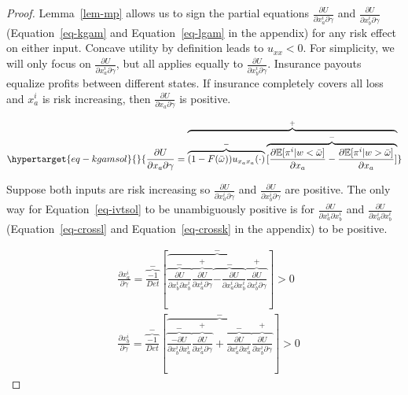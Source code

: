 \documentclass[
  letterpaper,
  DIV=11,
  numbers=noendperiod]{scrartcl}
\theoremstyle{plain}
\theoremstyle{plain}
\theoremstyle{remark}
\begin{document}
\begin{proof}

Lemma~\ref{lem-mp} allows us to sign the partial equations
\(\frac{\partial U}{\partial x^i_a\partial \gamma}\) and
\(\frac{\partial U}{\partial x^i_b\partial \gamma}\)
(Equation~\ref{eq-kgam} and Equation~\ref{eq-lgam} in the appendix) for
any risk effect on either input. Concave utility by definition leads to
\(u_{xx}<0\). For simplicity, we will only focus on
\(\frac{\partial U}{\partial x^i_a\partial \gamma}\), but all applies
equally to \(\frac{\partial U}{\partial x^i_b\partial \gamma}\).
Insurance payouts equalize profits between different states. If
insurance completely covers all loss and \(x^i_a\) is risk increasing,
then \(\frac{\partial U}{\partial x_a\partial \gamma}\) is positive.

\begin{equation}\protect\hypertarget{eq-kgamsol}{}{
\frac{\partial U}{\partial x_a \partial \gamma}=\overbrace{\overbrace{(1-F(\bar\omega))u_{x_ax_a}(\cdot)}^{-}\overbrace{[\frac{\partial \mathbb{E}[\pi^i|w<\bar\omega]}{\partial x_a}-\frac{\partial \mathbb{E}[\pi^i|w>\bar\omega]}{\partial x_a}]}^{-}}^{+}
}\label{eq-kgamsol}\end{equation}

Suppose both inputs are risk increasing so
\(\frac{\partial U}{\partial x^i_a\partial \gamma}\) and
\(\frac{\partial U}{\partial x^i_b\partial \gamma}\) are positive. The
only way for Equation~\ref{eq-ivtsol} to be unambiguously positive is
for \(\frac{\partial U}{\partial x^i_a\partial x^i_b}\) and
\(\frac{\partial U}{\partial x^i_a\partial x^i_b}\)
(Equation~\ref{eq-crossl} and Equation~\ref{eq-crossk} in the appendix)
to be positive.

\[
\begin{aligned}
&\frac{\partial x^i_a}{\partial \gamma}=\overbrace{\frac{-1}{Det}}^{-}\left[\overbrace{\overbrace{\frac{\partial U}{\partial x^i_b \partial x^i_b}}^{-}\overbrace{\frac{\partial U}{\partial x^i_a \partial \gamma}}^{+}\overbrace{-\frac{\partial U}{\partial x^i_a \partial x^i_b}}^{-}\overbrace{\frac{\partial U}{\partial x^i_b \partial \gamma}}^{+}}^{-}\right] >0\\
&\frac{\partial x^i_b}{\partial \gamma}=\overbrace{\frac{-1}{Det}}^{-}\left[\overbrace{\overbrace{\frac{-\partial U}{\partial x^i_b \partial x^i_a}}^{-}\overbrace{\frac{\partial U}{\partial x^i_a \partial \gamma}}^{+}+\overbrace{\frac{\partial U}{\partial x^i_a \partial x^i_a}}^{-}\overbrace{\frac{\partial U}{\partial x^i_b \partial \gamma}}^{+}}^{-}\right]>0
\end{aligned}
\]


\end{proof}
\end{document}
